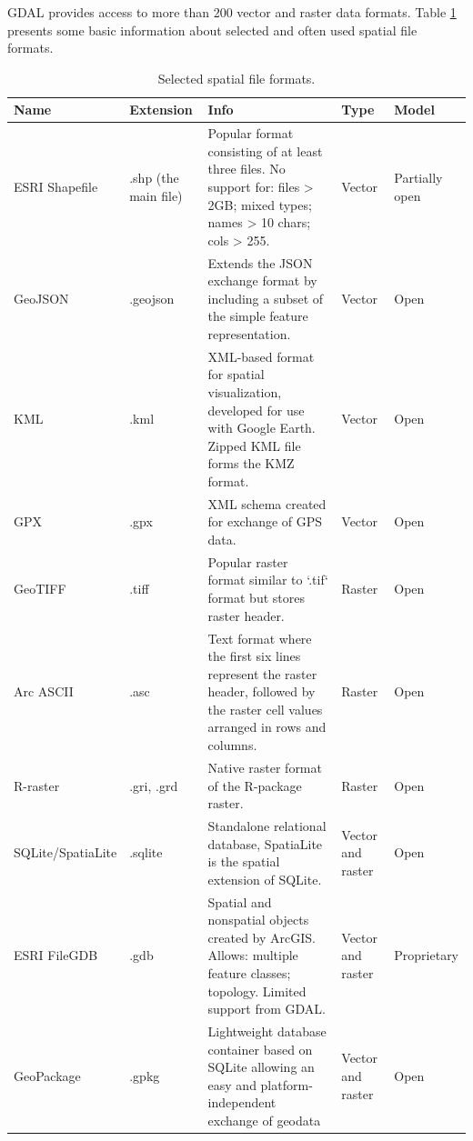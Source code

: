 \documentclass[]{krantz}
\begin{document}
GDAL provides access to more than 200 vector and raster data formats.
Table \ref{tab:formats} presents some basic information about selected and often used spatial file formats.

\begin{table}[t]

\caption[Selected spatial file formats.]{\label{tab:formats}Selected spatial file formats.}
\centering
\begin{tabular}{l>{\raggedright\arraybackslash}p{7em}>{\raggedright\arraybackslash}p{14em}l>{\raggedright\arraybackslash}p{7em}}
\toprule
Name & Extension & Info & Type & Model\\
\midrule
ESRI Shapefile & .shp (the main file) & Popular format consisting of at least three files. No support for: files > 2GB;  mixed types; names > 10 chars; cols > 255. & Vector & Partially open\\
GeoJSON & .geojson & Extends the JSON exchange format by including a subset of the simple feature representation. & Vector & Open\\
KML & .kml & XML-based format for spatial visualization, developed for use with Google Earth. Zipped KML file forms the KMZ format. & Vector & Open\\
GPX & .gpx & XML schema created for exchange of GPS data. & Vector & Open\\
GeoTIFF & .tiff & Popular raster format similar to `.tif` format but stores raster header. & Raster & Open\\
\addlinespace
Arc ASCII & .asc & Text format where the first six lines represent the raster header, followed by the raster cell values arranged in rows and columns. & Raster & Open\\
R-raster & .gri, .grd & Native raster format of the R-package raster. & Raster & Open\\
SQLite/SpatiaLite & .sqlite & Standalone  relational database, SpatiaLite is the spatial extension of SQLite. & Vector and raster & Open\\
ESRI FileGDB & .gdb & Spatial and nonspatial objects created by ArcGIS. Allows: multiple feature classes; topology. Limited support from GDAL. & Vector and raster & Proprietary\\
GeoPackage & .gpkg & Lightweight database container based on SQLite allowing an easy and platform-independent exchange of geodata & Vector and raster & Open\\
\bottomrule
\end{tabular}
\end{table}
\end{document}

